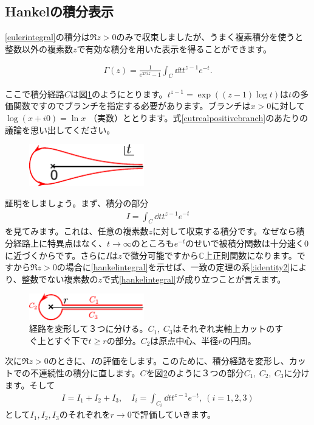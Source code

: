 \documentclass[report,paper=a4, fontsize=12pt, line_length=16cm, number_of_lines=33,dvipdfmx]{jlreq}
\newenvironment{important}{\begin{tcolorbox}[
  colback = white,
  colframe = red!35,
  boxrule = 2mm,
  fonttitle = \bfseries,
  after = \noindent] }{\end{tcolorbox}}
\numberwithin{equation}{section}
\newcommand{\Cb}{\mathbb{C}}
\begin{document}
\subsection{Hankelの積分表示}
\eqref{eulerintegral}の積分は$\Re z>0$のみで収束しましたが、うまく複素積分を使うと整数以外の複素数$z$で有効な積分を用いた表示を得ることができます。
\begin{important}
  \begin{align}
    \Gamma(z)=\frac{1}{e^{2\pi i z}-1}\int_{C}\dd{t}t^{z-1}e^{-t}.\label{hankelintegral}
  \end{align}
\end{important}
ここで積分経路$C$は図\ref{fig:hankel}のようにとります。$t^{z-1}=\exp((z-1)\log t)$は$t$の多価関数ですのでブランチを指定する必要があります。ブランチは$x>0$に対して$\log(x+i0)=\ln x$ （実数）ととります。式\eqref{cutrealpositivebranch}のあたりの議論を思い出してください。
\begin{figure}[htbp]
  \centering
  \includegraphics[width=5cm]{hankel.pdf}
  \caption{}
  \label{fig:hankel}
\end{figure}


証明をしましょう。まず、積分の部分
\begin{align}
  I=\int_{C}\dd{t}t^{z-1}e^{-t}
\end{align}
を見てみます。これは、任意の複素数$z$に対して収束する積分です。なぜなら積分経路上に特異点はなく、$t\to \infty$のところも$e^{-t}$のせいで被積分関数は十分速く$0$に近づくからです。さらに$I$は$z$で微分可能ですから$\Cb$上正則関数になります。ですから$\Re z>0$の場合に\eqref{hankelintegral}を示せば、一致の定理の系\ref{:identity2}により、整数でない複素数の$z$で式\eqref{hankelintegral}が成り立つことが言えます。

\begin{figure}[htbp]
  \centering
  \includegraphics[width=5cm]{hankel2.pdf}
  \caption{経路を変形して３つに分ける。$C_1, \ C_3$はそれぞれ実軸上カットのすぐ上とすぐ下で$t\ge r$の部分。$C_2$は原点中心、半径$r$の円周。}
  \label{fig:hankel2}
\end{figure}
次に$\Re z>0$のときに、$I$の評価をします。このために、積分経路を変形し、カットでの不連続性の積分に直します。$C$を図\ref{fig:hankel2}のように３つの部分$C_1,\ C_2,\ C_3$に分けます。そして
\begin{align}
  I=I_1+I_2+I_3,\quad I_i=\int_{C_i}\dd{t}t^{z-1}e^{-t},\ (i=1,2,3)
\end{align}
として$I_1,I_2,I_3$のそれぞれを$r\to 0$で評価していきます。
\end{document}
